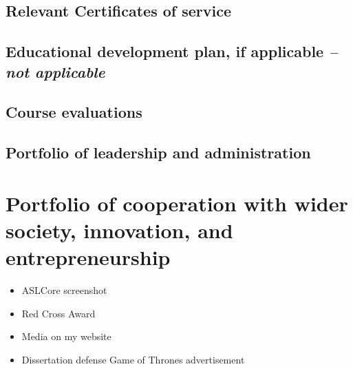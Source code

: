 \section{Relevant Certificates of service \noneyet} \label{sec:relevant-certificates-of-service-noneyet}
\section{Educational development plan, if applicable \normalsize{\textit{-- not applicable}}} \label{sec:educational-development-plan-if-applicable-not-applicable}
\section{Course evaluations} \label{sec:course-evaluations}

\section{Portfolio of leadership and administration} \label{sec:portfolio-of-leadership-and-administration}

\setcounter{chapter}{6}
\chapter{Portfolio of cooperation with wider society, innovation, and entrepreneurship}
\begin{itemize}
	\item ASLCore screenshot
	\item Red Cross Award
	\item Media on my website
	\item Dissertation defense Game of Thrones advertisement
\end{itemize}

